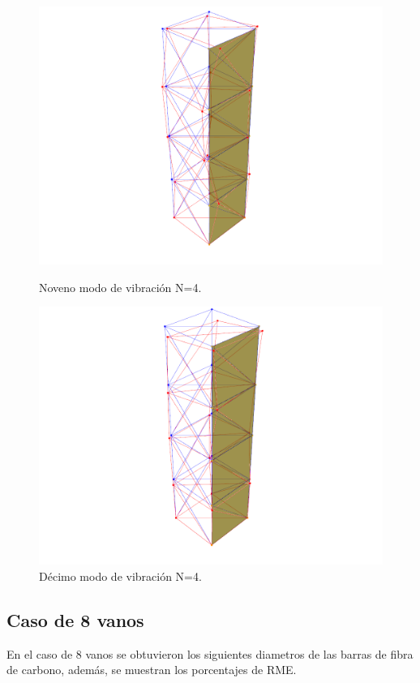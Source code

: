 \begin{figure}[H]
    \begin{minipage}[b]{0.5\textwidth}
        \centering
        \includegraphics[width=\textwidth]{FOTOS/mod9_4.png}
        \caption{Noveno modo de vibración N=4.}
    \end{minipage}
    \hfill
    \begin{minipage}[b]{0.5\textwidth}
        \centering
        \includegraphics[width=\textwidth]{FOTOS/mod10_4.png}
        \caption{Décimo modo de vibración N=4.}
    \end{minipage}
\end{figure}


\subsection{Caso de 8 vanos}
En el caso de 8 vanos se obtuvieron los siguientes diametros de las barras de fibra de carbono, además, se muestran los porcentajes de RME.

